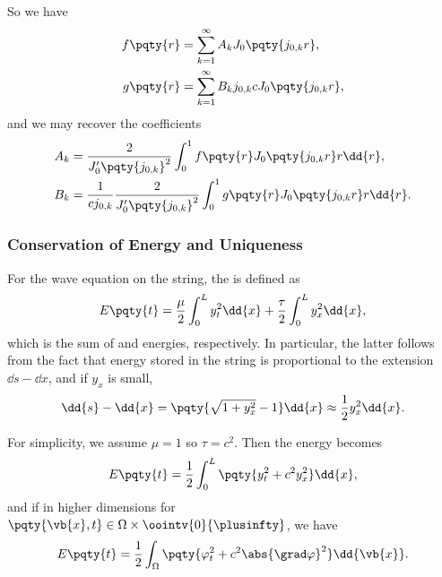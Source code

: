 {\normalsize

So we have
\begin{subequations}
    \begin{align}
        f\pqty{r} &= \sum_{k = 1}^{\infty} A_k J_0 \pqty{j_{0, k} r}, \\
        g\pqty{r} &= \sum_{k = 1}^{\infty} B_k j_{0, k} c J_0 \pqty{j_{0, k} r},
    \end{align}
\end{subequations}
and we may recover the coefficients
\begin{subequations}
    \begin{align}
        A_k &= \frac{2}{J_0' \pqty{j_{0, k}}^2} \int_{0}^{1} f\pqty{r} J_0 \pqty{j_{0, k} r} r \dd{r}, \\
        B_k &= \frac{1}{c j_{0, k}} \frac{2}{J_0' \pqty{j_{0, k}}^2} \int_{0}^{1} g\pqty{r} J_0 \pqty{j_{0, k} r} r \dd{r}.
    \end{align}
\end{subequations}

\subsubsection{Conservation of Energy and Uniqueness}

For the wave equation on the string, the  is defined as
\begin{equation}
    E\pqty{t} = \frac{\mu}{2} \int_{0}^{L} y_t^2 \dd{x} + \frac{\tau}{2} \int_{0}^{L} y_x^2 \dd{x},
\end{equation}
which is the sum of  and  energies, respectively. In particular, the latter follows from the fact that energy stored in the string is proportional to the extension \(\dd{s} - \dd{x}\), and if \(y_x\) is small,
\begin{equation}
    \dd{s} - \dd{x} = \pqty{\sqrt{1 + y_x^2} - 1} \dd{x} \approx \frac{1}{2} y_x^2 \dd{x}.
\end{equation}

For simplicity, we assume \(\mu = 1\) so \(\tau = c^2\). Then the energy becomes
\begin{equation}
    E\pqty{t} = \frac{1}{2} \int_{0}^{L} \pqty{y_t^2 + c^2 y_x^2} \dd{x},
\end{equation}
and if in higher dimensions for \(\pqty{\vb{x}, t} \in \Omega \times \oointv{0}{\plusinfty}\), we have
\begin{equation}
    E\pqty{t} = \frac{1}{2} \int_{\Omega} \pqty{\varphi_t^2 + c^2 \abs{\grad \varphi}^2} \dd{\vb{x}}.
\end{equation}

}
